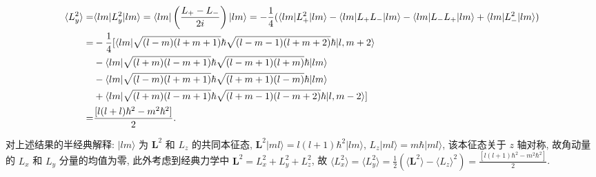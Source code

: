 \documentclass{assignment}
\begin{document}
\begin{pf}
\begin{align}
        \notag\langle L_y^2\rangle=&\langle lm\rvert L_y^2\lvert lm\rangle=\langle lm\rvert\left(\frac{L_+-L_-}{2i}\right)\lvert lm\rangle=-\frac{1}{4}(\langle lm\rvert L_+^2\lvert lm\rangle-\langle lm\rvert L_+L_-\lvert lm\rangle-\langle lm\rvert L_-L_+\lvert lm\rangle+\langle lm\rvert L_-^2\lvert lm\rangle)\\
        \notag=&-\frac{1}{4}[\langle lm\rvert\sqrt{(l-m)(l+m+1)}\hbar\sqrt{(l-m-1)(l+m+2)}\hbar\lvert l,m+2\rangle\\
        \notag&-\langle lm\rvert\sqrt{(l+m)(l-m+1)}\hbar\sqrt{(l-m+1)(l+m)}\hbar\lvert lm\rangle\\
        \notag&-\langle lm\rvert\sqrt{(l-m)(l+m+1)}\hbar\sqrt{(l+m+1)(l-m)}\hbar\lvert lm\rangle\\
        \notag&+\langle lm\rvert\sqrt{(l+m)(l-m+1)}\hbar\sqrt{(l+m-1)(l-m+2)}\hbar\lvert l,m-2\rangle]\\
        =&\frac{[l(l+l)\hbar^2-m^2\hbar^2]}{2}.
    \end{align}

    对上述结果的半经典解释: $\lvert lm\rangle$ 为 $\bm{L}^2$ 和 $L_z$ 的共同本征态, $\bm{L}^2\lvert ml\rangle=l(l+1)\hbar^2\lvert lm\rangle$, $L_z\lvert ml\rangle=m\hbar\lvert ml\rangle$, 该本征态关于 $z$ 轴对称, 故角动量的 $L_x$ 和 $L_y$ 分量的均值为零, 此外考虑到经典力学中 $\bm{L}^2=L_x^2+L_y^2+L_z^2$, 故 $\langle L_x^2\rangle=\langle L_y^2\rangle=\frac{1}{2}(\langle\bm{L}^2\rangle-\langle L_z\rangle^2)=\frac{[l(l+1)\hbar^2-m^2\hbar^2]}{2}$.
\end{pf}
\end{document}
